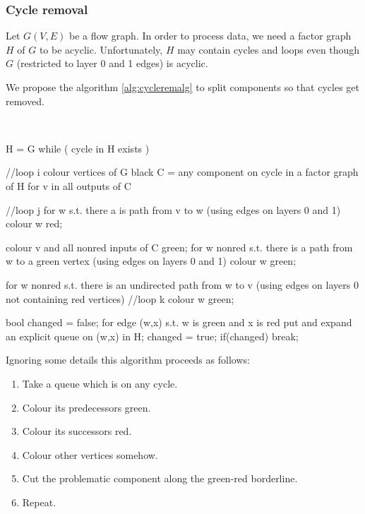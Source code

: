 \subsubsection{Cycle removal}

Let $G(V,E)$ be a flow graph. In order to process data, we need a factor graph $H$ of $G$ to be acyclic. Unfortunately, $H$ may contain cycles and loops even though $G$ (restricted to layer 0 and 1 edges) is acyclic. 


We propose the algorithm \ref{alg:cycleremalg} to split components so that cycles get removed. 

\ \
\begin{samepage}
\begin{code}
  H = G
while ( cycle in H exists )     
{ //loop i
  colour vertices of G black
  C = any component on cycle in a factor graph of H
  for v in all outputs of C     
  { //loop j
    for w s.t. there a is path from v to w 
    (using edges on layers 0 and 1)
    {
      colour w red;
    }

    colour v and all nonred inputs of C green;
    for w nonred s.t. there is a path from w to a green vertex
    (using edges on layers 0 and 1)
    {
      colour w green;
    }

    for w nonred s.t. there is an undirected path from w to v
    (using edges on layers 0 not containing red vertices)
    { //loop k
      colour w green;
    }

    bool changed = false;
    for edge (w,x) s.t. w is green and x is red
    {
      put and expand an explicit queue on (w,x) in H;
      changed = true;
    }
    if(changed)
      break;
  }
}
\end{code}
\end{samepage}
\myendalg

Ignoring some details this algorithm proceeds as follows:
\begin{enumerate}
  \item Take a queue which is on any cycle.
  \item Colour its predecessors green.
  \item Colour its successors red.
  \item Colour other vertices somehow.
  \item Cut the problematic component along the green-red borderline.
  \item Repeat.
\end{enumerate}

